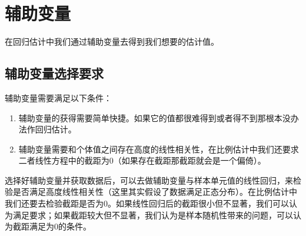 \section{辅助变量}
在回归估计中我们通过辅助变量去得到我们想要的估计值。

\subsection{辅助变量选择要求}
辅助变量需要满足以下条件：
\begin{enumerate}
	\item 辅助变量的获得需要简单快捷。如果它的值都很难得到或者得不到那根本没办法作回归估计。
	\item 辅助变量需要和个体值之间存在高度的线性相关性，在比例估计中我们还要求二者线性方程中的截距为$0$（如果存在截距那截距就会是一个偏倚）。
\end{enumerate}
\hspace{2em}选择好辅助变量并获取数据后，可以去做辅助变量与样本单元值的线性回归，来检验是否满足高度线性相关性（这里其实假设了数据满足正态分布）。在比例估计中我们还要去检验截距是否为$0$。如果线性回归后的截距很小但不显著，我们可以认为满足要求；如果截距较大但不显著，我们认为是样本随机性带来的问题，可以认为截距满足为$0$的条件。\par


